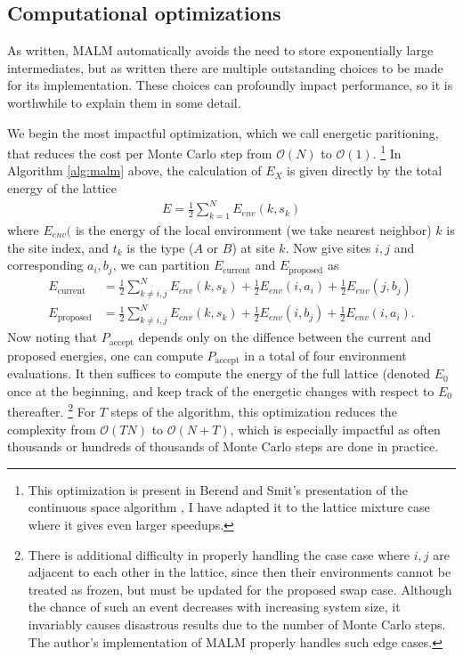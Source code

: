 \documentclass[10pt]{article}
\begin{document}
\subsection{Computational optimizations}
As written, MALM automatically avoids the need to store exponentially large intermediates, but as written there are multiple outstanding choices to be made for its implementation.
These choices can profoundly impact performance, so it is worthwhile to explain them in some detail.

We begin the most impactful optimization, which we call energetic paritioning, that reduces the cost per Monte Carlo step from $\mathcal{O}(N)$ to $\mathcal{O}(1)$. \footnote{This optimization is present in Berend and Smit's presentation of the continuous space algorithm \cite{md}, I have adapted it to the lattice mixture case where it gives even larger speedups.}
In Algorithm \ref{alg:malm} above, the calculation of $E_{X}$ is given directly by the total energy of the lattice
\begin{align}
    E = \frac{1}{2} \sum_{k=1}^N E_{env}(k,s_k)
\end{align}
where $E_{env}($ is the energy of the local environment (we take nearest neighbor) $k$ is the site index, and $t_k$ is the type ($A$ or $B$) at site $k$.
Now give sites $i,j$ and corresponding $a_i,b_j$, we can partition $E_{\text{current}}$ and $E_{\text{proposed}}$ as
\begin{align}
    E_{\text{current}} &= \frac{1}{2} \sum_{k \ne i,j}^N E_{env}(k,s_k) +
    \frac{1}{2} E_{env}(i,a_i) + \frac{1}{2} E_{env}(j,b_j) \\
    E_{\text{proposed}} &= \frac{1}{2} \sum_{k \ne i,j}^N E_{env}(k,s_k) +
    \frac{1}{2} E_{env}(i,b_j) + \frac{1}{2} E_{env}(i,a_i).
\end{align}
Now noting that $P_{\text{accept}}$ depends only on the diffence between the current and proposed energies, one can compute $P_{\text{accept}}$ in a total of four environment evaluations.
It then suffices to compute the energy of the full lattice (denoted $E_0$ once at the beginning, and keep track of the energetic changes with respect to $E_0$ thereafter. \footnote{There is additional difficulty in properly handling the case case where $i,j$ are adjacent to each other in the lattice, since then their environments cannot be treated as frozen, but must be updated for the proposed swap case.
Although the chance of such an event decreases with increasing system size, it invariably causes disastrous results due to the number of Monte Carlo steps.
The author's implementation of MALM properly handles such edge cases.}
For $T$ steps of the algorithm, this optimization reduces the complexity from $\mathcal{O}(TN)$ to $\mathcal{O}(N+T)$, which is especially impactful as often thousands or hundreds of thousands of Monte Carlo steps are done in practice.
\end{document}
